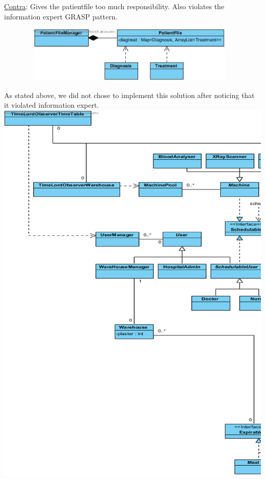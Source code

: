 \documentclass[11pt]{article}
\begin{document}
\underline{Contra}: Gives the patientfile too much responsibility. Also violates the information expert GRASP pattern. 
\begin{center}
\includegraphics[width=130mm, height=27mm]{patientfilediagfail.jpg}
\end{center}
As stated above, we did not chose to implement this solution after noticing that it violated information expert.\\
\includegraphics[width=170mm]{left1.png}\\
\end{document}
